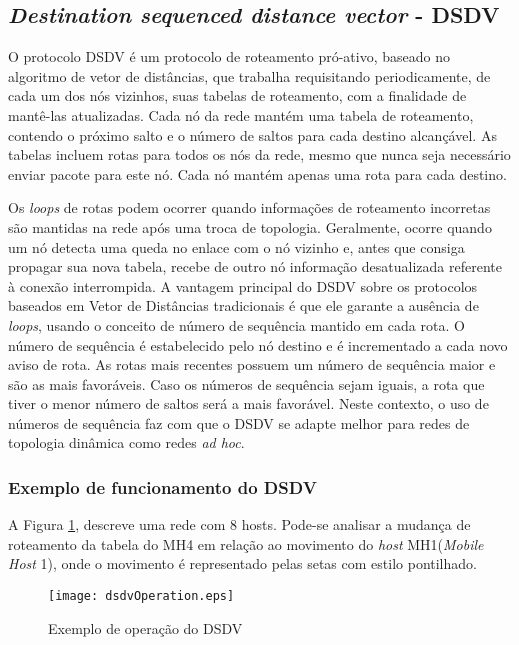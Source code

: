 \subsection{\textit{Destination sequenced distance vector} - DSDV}\label{subDSDV} 
O protocolo DSDV \'e um protocolo de roteamento pr\'o-ativo\cite{gorantala}, baseado no algoritmo de vetor de dist\^ancias, que trabalha requisitando periodicamente, de cada um dos n\'os vizinhos, suas tabelas de roteamento, com a finalidade de mant\^e-las atualizadas. 
Cada n\'o da rede mant\'em uma tabela de roteamento, contendo o pr\'oximo salto e o n\'umero de saltos para cada destino alcan\c{c}\'avel. 
As tabelas incluem rotas para todos os n\'os da rede, mesmo que nunca seja necess\'ario enviar pacote para este n\'o. 
Cada n\'o mant\'em apenas uma rota para cada destino.

Os \textit{loops} de rotas podem ocorrer quando informa\c{c}\~oes de roteamento incorretas s\~ao mantidas na rede ap\'os uma troca de topologia. 
Geralmente, ocorre quando um n\'o detecta uma queda no enlace com o n\'o vizinho e, antes que consiga propagar sua nova tabela, recebe de outro n\'o informa\c{c}\~ao desatualizada referente \`a conex\~ao interrompida. 
A vantagem principal do DSDV sobre os protocolos baseados em Vetor de Dist\^ancias tradicionais \'e que ele garante a aus\^encia de \textit{loops}, usando o conceito de n\'umero de sequ\^encia mantido em cada rota. 
O n\'umero de sequ\^encia \'e estabelecido pelo n\'o destino e \'e incrementado a cada novo aviso de rota.
As rotas mais recentes possuem um n\'umero de sequ\^encia maior e s\~ao as mais favor\'aveis. 
Caso os n\'umeros de sequ\^encia sejam iguais, a rota que tiver o menor n\'umero de saltos ser\'a a mais favor\'avel. 
Neste contexto, o uso de n\'umeros de sequ\^encia faz com que o DSDV se adapte melhor para redes de topologia din\^amica como redes \textit{ad hoc}.

\subsubsection{Exemplo de funcionamento do DSDV}

A Figura \ref{figOpDSDV}, descreve uma rede com 8 hosts. 
Pode-se analisar a mudan\c{c}a de roteamento da tabela do MH4 em rela\c{c}\~ao ao movimento do \textit{host} MH1(\textit{Mobile Host} 1), onde o movimento \'e representado pelas setas com estilo pontilhado. 

\begin{figure}[H]
	\centering
	\texttt{[image: dsdvOperation.eps]}
	\caption{Exemplo de opera\c{c}\~ ao do DSDV}
	\label{figOpDSDV}
\end{figure}

